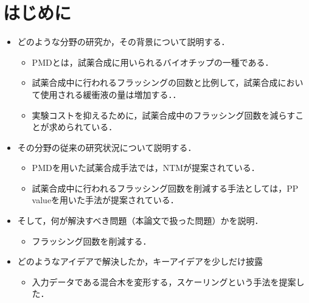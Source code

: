 \chapter{はじめに}
\begin{itemize}
 \setlength{\parskip}{0cm} %
 \setlength{\itemsep}{0cm} %
 \item どのような分野の研究か，その背景について説明する．
    \begin{itemize}
        \item PMDとは，試薬合成に用いられるバイオチップの一種である．
        \item 試薬合成中に行われるフラッシングの回数と比例して，試薬合成において使用される緩衝液の量は増加する．．
        \item 実験コストを抑えるために，試薬合成中のフラッシング回数を減らすことが求められている．
    \end{itemize}
 \item その分野の従来の研究状況について説明する．
     \begin{itemize}
        \item PMDを用いた試薬合成手法では，NTMが提案されている．
        \item 試薬合成中に行われるフラッシング回数を削減する手法としては，PP valueを用いた手法が提案されている．
    \end{itemize}

 \item そして，何が解決すべき問題（本論文で扱った問題）かを説明．
    \begin{itemize}
        \item フラッシング回数を削減する．
    \end{itemize}
 \item どのようなアイデアで解決したか，キーアイデアを少しだけ披露
    \begin{itemize}
        \item 入力データである混合木を変形する，スケーリングという手法を提案した．


\end{itemize}
\end{itemize}
